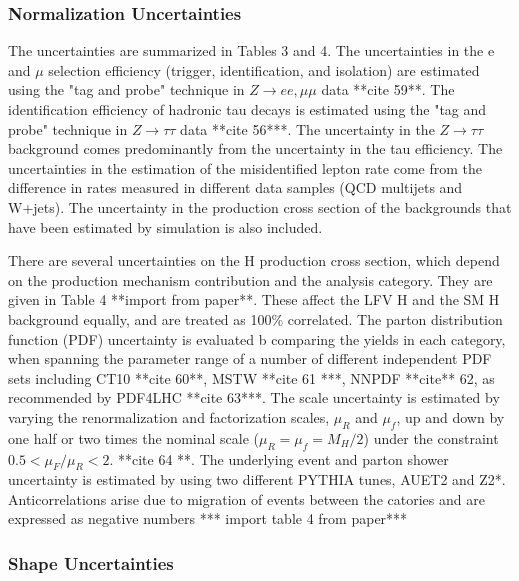 \documentclass[oneside, letterpaper, oldfontcommands]{memoir}
\begin{document}
{{{\subsubsection{Normalization Uncertainties}

\qquad The uncertainties are summarized in Tables 3 and 4. The uncertainties in the e and $\mu$ selection efficiency (trigger, identification, and isolation) are estimated using the "tag and probe" technique in $Z \rightarrow ee,\mu\mu$ data **cite 59**. The identification efficiency of hadronic tau decays is estimated using the "tag and probe" technique in $Z \rightarrow \tau\tau$ data **cite 56***. The uncertainty in the $Z \rightarrow \tau\tau$ background comes predominantly from the uncertainty in the tau efficiency. The uncertainties in the estimation of the misidentified lepton rate come from the difference in rates measured in different data samples (QCD multijets and W+jets). The uncertainty in the production cross section of the backgrounds that have been estimated by simulation is also included.

\qquad There are several uncertainties on the H production cross section, which depend on the production mechanism contribution and the analysis category. They are given in Table 4 **import from paper**. These affect the LFV H and the SM H background equally, and are treated as 100\% correlated. The parton distribution function (PDF) uncertainty is evaluated b comparing the yields in each category, when spanning the parameter range of a number of different independent PDF sets including CT10 **cite 60**, MSTW **cite 61 ***, NNPDF **cite** 62, as recommended by PDF4LHC **cite 63***. The scale uncertainty is estimated by varying the renormalization and factorization scales, $\mu_{R}$ and $\mu_{f}$, up and down by one half or two times the nominal scale ($\mu_{R} = \mu_{f} = M_{H}/2$) under the constraint $0.5 < \mu_{F}/\mu_{R} < 2$. **cite 64 **. The underlying event and parton shower uncertainty is estimated by using two different PYTHIA tunes, AUET2 and Z2*. Anticorrelations arise due to migration of events between the catories and are expressed as negative numbers
 *** import table 4 from paper***
 
\subsubsection{Shape Uncertainties}

}}}
\end{document}
